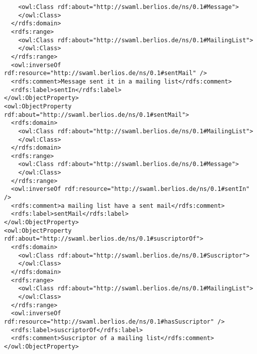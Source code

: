\begin{lstlisting}
    <owl:Class rdf:about="http://swaml.berlios.de/ns/0.1#Message">
    </owl:Class>
  </rdfs:domain>
  <rdfs:range>
    <owl:Class rdf:about="http://swaml.berlios.de/ns/0.1#MailingList">
    </owl:Class>
  </rdfs:range>
  <owl:inverseOf rdf:resource="http://swaml.berlios.de/ns/0.1#sentMail" />
  <rdfs:comment>Message sent it in a mailing list</rdfs:comment>
  <rdfs:label>sentIn</rdfs:label>
</owl:ObjectProperty>
<owl:ObjectProperty rdf:about="http://swaml.berlios.de/ns/0.1#sentMail">
  <rdfs:domain>
    <owl:Class rdf:about="http://swaml.berlios.de/ns/0.1#MailingList">
    </owl:Class>
  </rdfs:domain>
  <rdfs:range>
    <owl:Class rdf:about="http://swaml.berlios.de/ns/0.1#Message">
    </owl:Class>
  </rdfs:range>
  <owl:inverseOf rdf:resource="http://swaml.berlios.de/ns/0.1#sentIn" />
  <rdfs:comment>a mailing list have a sent mail</rdfs:comment>
  <rdfs:label>sentMail</rdfs:label>
</owl:ObjectProperty>
<owl:ObjectProperty rdf:about="http://swaml.berlios.de/ns/0.1#suscriptorOf">
  <rdfs:domain>
    <owl:Class rdf:about="http://swaml.berlios.de/ns/0.1#Suscriptor">
    </owl:Class>
  </rdfs:domain>
  <rdfs:range>
    <owl:Class rdf:about="http://swaml.berlios.de/ns/0.1#MailingList">
    </owl:Class>
  </rdfs:range>
  <owl:inverseOf rdf:resource="http://swaml.berlios.de/ns/0.1#hasSuscriptor" />
  <rdfs:label>suscriptorOf</rdfs:label>
  <rdfs:comment>Suscriptor of a mailing list</rdfs:comment>
</owl:ObjectProperty>


\end{lstlisting}
